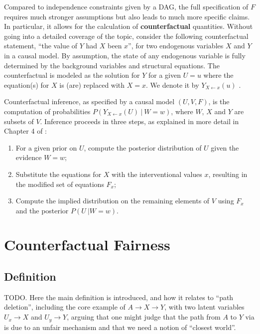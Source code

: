 \documentclass{article}
\begin{document}
Compared to independence constraints given by a DAG, the full
specification of $F$ requires much stronger assumptions but also leads
to much more specific claims. In particular, it allows for the
calculation of {\bf counterfactual} quantities. Without going into a
detailed coverage of the topic, consider the following counterfactual
statement, ``the value of $Y$ had $X$ been $x$'', for two endogenous
variables $X$ and $Y$ in a causal model. By assumption, the state of
any endogenous variable is fully determined by
the background variables and structural equations. The counterfactual is
modeled as the solution for $Y$ for a given $U = u$ where the equation(s)
for $X$ is (are) replaced with $X = x$.  We denote it by $Y_{X \leftarrow x}(u)$
\cite{pearl:00}.

Counterfactual inference, as specified by a causal model $(U, V, F)$,
is the computation of probabilities $P(Y_{X \leftarrow x}(U)\ |\ W =
w)$, where $W$, $X$ and $Y$ are subsets of $V$. Inference proceeds in
three steps, as explained in more detail in Chapter 4 of
\cite{pearl:16}:
\begin{enumerate}
\item For a given prior on $U$, compute the posterior distribution of $U$ given the evidence $W = w$;
\item Substitute the equations for $X$ with the interventional values $x$, resulting
     in the modified set of equations $F_x$;
\item Compute the implied distribution on the remaining elements of $V$
     using $F_x$ and the posterior $P(U\ | W = w)$.
\end{enumerate}

\section{Counterfactual Fairness}
\label{sec:count_fair}

\subsection{Definition}

TODO. Here the main definition is introduced, and how it relates to ``path deletion'',
including the core example of $A \rightarrow X \rightarrow Y$, with two latent
variables $U_x \rightarrow X$ and $U_y \rightarrow Y$, arguing that one might judge
that the path from $A$ to $Y$ via is due to an unfair mechanism and that we need a
notion of ``closest world''.
\end{document}
